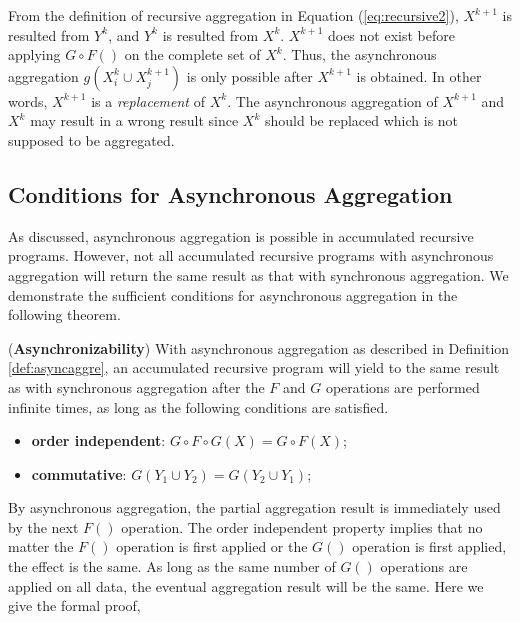 {From the definition of recursive aggregation in Equation (\ref{eq:recursive2}), $X^{k+1}$ is resulted from $Y^k$, and $Y^k$ is resulted from $X^k$. $X^{k+1}$ does not exist before applying $G\circ F()$ on the complete set of $X^k$. Thus, the asynchronous aggregation $g(X_i^k\cup X_j^{k+1})$ is only possible after $X^{k+1}$ is obtained. In other words, $X^{k+1}$ is a \emph{replacement} of $X^k$. The asynchronous aggregation of $X^{k+1}$ and $X^k$ may result in a wrong result since $X^k$ should be replaced which is not supposed to be aggregated.




\subsection{Conditions for Asynchronous Aggregation}
\label{sec:async:condition}

As discussed, asynchronous aggregation is possible in accumulated recursive programs. However, not all accumulated recursive programs with asynchronous aggregation will return the same result as that with synchronous aggregation. We demonstrate the sufficient conditions for asynchronous aggregation in the following theorem.

\begin{theorem}
	\label{th:async}
	(\textbf{Asynchronizability}) With asynchronous aggregation as described in Definition \ref{def:asyncaggre}, an accumulated recursive program will yield to the same result as with synchronous aggregation after the $F$ and $G$ operations are performed infinite times, as long as the following conditions are satisfied.
	\begin{itemize}
		\item \textbf{order independent}: $G\circ F\circ G(X)=G\circ F(X)$;
		\item \textbf{commutative}: $G(Y_1\cup Y_2)=G(Y_2\cup Y_1)$;
	\end{itemize}
\end{theorem}

By asynchronous aggregation, the partial aggregation result is immediately used by the next $F()$ operation. The order independent property implies that no matter the $F()$ operation is first applied or the $G()$ operation is first applied, the effect is the same. As long as the same number of $G()$ operations are applied on all data, the eventual aggregation result will be the same.%
Here we give the formal proof,

}
